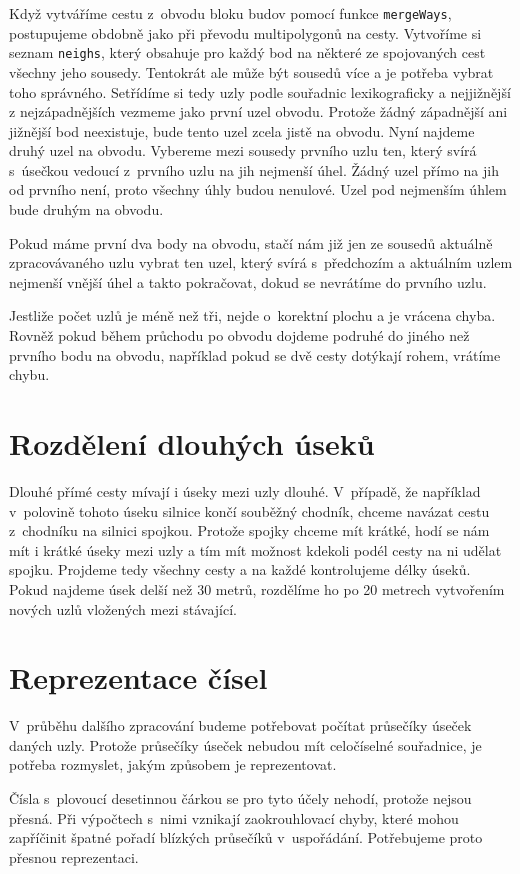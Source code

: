 Když vytváříme cestu z~obvodu bloku budov pomocí funkce \verb|mergeWays|,
postupujeme obdobně jako při převodu multipolygonů na cesty. Vytvoříme si seznam
\verb|neighs|, který obsahuje pro každý bod na některé ze spojovaných cest
všechny jeho sousedy. Tentokrát ale může být sousedů více a je potřeba vybrat
toho správného. Setřídíme si tedy uzly podle souřadnic lexikograficky a
nejjižnější z nejzápadnějších vezmeme jako první uzel obvodu.  Protože žádný
západnější ani jižnější bod neexistuje, bude tento uzel zcela jistě na obvodu.
Nyní najdeme druhý uzel na obvodu. Vybereme mezi sousedy prvního uzlu ten, který
svírá s~úsečkou vedoucí z~prvního uzlu na jih nejmenší úhel. Žádný uzel přímo na
jih od prvního není, proto všechny úhly budou nenulové. Uzel pod nejmenším úhlem
bude druhým na obvodu.

Pokud máme první dva body na obvodu, stačí nám již jen ze sousedů aktuálně
zpracovávaného uzlu vybrat ten uzel, který svírá s~předchozím a aktuálním uzlem
nejmenší vnější úhel a takto pokračovat, dokud se nevrátíme do prvního uzlu.

Jestliže počet uzlů je méně než tři, nejde o~korektní plochu a je vrácena chyba.
Rovněž pokud během průchodu po obvodu dojdeme podruhé do jiného než prvního bodu
na obvodu, například pokud se dvě cesty dotýkají rohem, vrátíme chybu.

\section{Rozdělení dlouhých úseků}
Dlouhé přímé cesty mívají i úseky mezi uzly dlouhé. V~případě, že například
v~polovině tohoto úseku silnice končí souběžný chodník, chceme navázat cestu
z~chodníku na silnici spojkou. Protože spojky chceme mít krátké, hodí se nám mít i
krátké úseky mezi uzly a tím mít možnost kdekoli podél cesty na ni udělat
spojku. Projdeme tedy všechny cesty a na každé kontrolujeme délky úseků. Pokud
najdeme úsek delší než 30 metrů, rozdělíme ho po 20 metrech vytvořením nových
uzlů vložených mezi stávající.

\section{Reprezentace čísel}
V~průběhu dalšího zpracování budeme potřebovat počítat průsečíky úseček daných
uzly. Protože průsečíky úseček nebudou mít celočíselné souřadnice, je potřeba
rozmyslet, jakým způsobem je reprezentovat.

{\tuc Čísla s~plovoucí desetinnou čárkou} se pro tyto účely nehodí, protože
nejsou přesná. Při výpočtech s~nimi vznikají zaokrouhlovací chyby, které mohou
zapříčinit špatné pořadí blízkých průsečíků v~uspořádání. Potřebujeme proto
přesnou reprezentaci.

